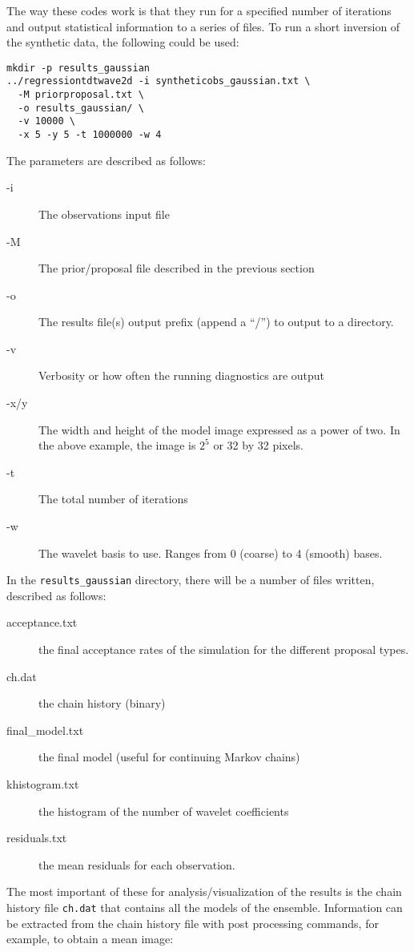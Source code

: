 \documentclass[a4paper,12pt]{article}
\begin{document}
The way these codes work is that they run for a specified number of
iterations and output statistical information to a series of files.
To run a short inversion of the synthetic data, the following
could be used:

\begin{verbatim}
mkdir -p results_gaussian
../regressiontdtwave2d -i syntheticobs_gaussian.txt \
  -M priorproposal.txt \
  -o results_gaussian/ \
  -v 10000 \
  -x 5 -y 5 -t 1000000 -w 4
\end{verbatim}

The parameters are described as follows:

\begin{description}
\item [-i] The observations input file
\item [-M] The prior/proposal file described in the previous section
\item [-o] The results file(s) output prefix (append a ``/'') to output to a
  directory.
\item [-v] Verbosity or how often the running diagnostics are output
\item [-x/y] The width and height of the model image expressed as a power of two. In
  the above example, the image is $2^5$ or 32 by 32 pixels.
\item [-t] The total number of iterations
\item [-w] The wavelet basis to use. Ranges from 0 (coarse) to 4 (smooth) bases.
\end{description}

In the {\tt results\_gaussian} directory, there will be a number of files written,
described as follows:

\begin{description}
\item[acceptance.txt] the final acceptance rates of the simulation for the different
  proposal types.
\item[ch.dat] the chain history (binary)
\item[final\_model.txt] the final model (useful for continuing Markov chains)
\item[khistogram.txt] the histogram of the number of wavelet coefficients
\item[residuals.txt] the mean residuals for each observation.
\end{description}

The most important of these for analysis/visualization of the results is the chain
history file {\tt ch.dat} that contains all the models of the ensemble.
Information can be extracted from the chain history file with post processing
commands, for example, to obtain a mean image:
\end{document}
